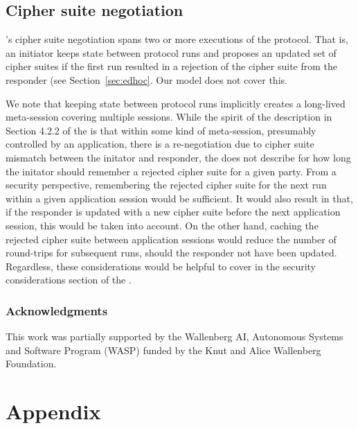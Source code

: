 \documentclass[runningheads,draft,x11names]{llncs}
\begin{document}
\subsection{Cipher suite negotiation}
\label{sec:ciphersuiteNegotiation}
%
\mEdhoc{}'s cipher suite negotiation spans two or more executions of the protocol.
%
That is, an initiator keeps state between protocol runs and proposes an updated
set of cipher suites if the first run resulted in a rejection of the
cipher suite from the responder (see Section~\ref{sec:edhoc}.
%
Our model does not cover this.
%

We note that keeping state between protocol runs implicitly creates a long-lived
meta-session covering multiple \mEdhoc{} sessions.
%
While the spirit of the description in Section 4.2.2 of the \mSpec{} is that
within some kind of meta-session, presumably controlled by an application,
there is a re-negotiation due to
cipher suite mismatch between the initator and responder, the \mSpec{} does not
describe for how long the initator should remember a rejected cipher suite for a
given party.
%
From a security perspective, remembering the rejected cipher suite for the
next \mEdhoc{} run within a given application session would be sufficient.
%
It would also result in that, if the responder is updated with a new cipher
suite before the next application session, this would be taken into account.
%
On the other hand, caching the rejected cipher suite between application
sessions would reduce the number of round-trips for subsequent runs, should
the responder not have been updated.
%
Regardless, these considerations would be helpful to cover in the security
considerations section of the \mSpec{}.
%

\subsubsection*{Acknowledgments} This work was partially supported by
the Wallenberg AI, Autonomous Systems and Software Program (WASP) funded by
the Knut and Alice Wallenberg Foundation.
%





\appendix
\section*{Appendix}


\end{document}
